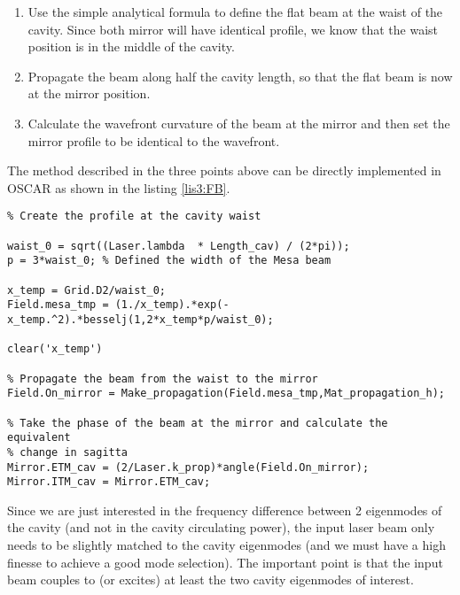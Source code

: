 

\begin{enumerate}
  \item Use the simple analytical formula to define the flat beam at the waist of the cavity. Since both mirror will have identical profile, we know that the waist position is in the middle of the cavity.
  \item Propagate the beam along half the cavity length, so that the flat beam is now at the mirror position.
  \item Calculate the wavefront curvature of the beam at the mirror and then set the mirror profile to be identical to the wavefront.
\end{enumerate}

The method described in the three points above can be directly implemented in OSCAR as shown in the listing \ref{lis3:FB}.

\begin{lstlisting}[float=btp,caption=Script to create the mirror profiles used to support a given light field \label{lis3:FB},frame=lines]
%---------------------- Create nearly concentric flat beam -------------------
% Create the profile at the cavity waist

waist_0 = sqrt((Laser.lambda  * Length_cav) / (2*pi));
p = 3*waist_0; % Defined the width of the Mesa beam

x_temp = Grid.D2/waist_0;
Field.mesa_tmp = (1./x_temp).*exp(-x_temp.^2).*besselj(1,2*x_temp*p/waist_0);

clear('x_temp')

% Propagate the beam from the waist to the mirror
Field.On_mirror = Make_propagation(Field.mesa_tmp,Mat_propagation_h);

% Take the phase of the beam at the mirror and calculate the equivalent
% change in sagitta
Mirror.ETM_cav = (2/Laser.k_prop)*angle(Field.On_mirror);
Mirror.ITM_cav = Mirror.ETM_cav;

\end{lstlisting}


Since we are just interested in the frequency difference between 2 eigenmodes of the cavity (and not in the cavity circulating power), the input laser beam only needs to be slightly matched to the cavity eigenmodes (and we must have a high finesse to achieve a good mode selection). The important point is that the input beam couples to (or excites) at least the two cavity eigenmodes of interest.

